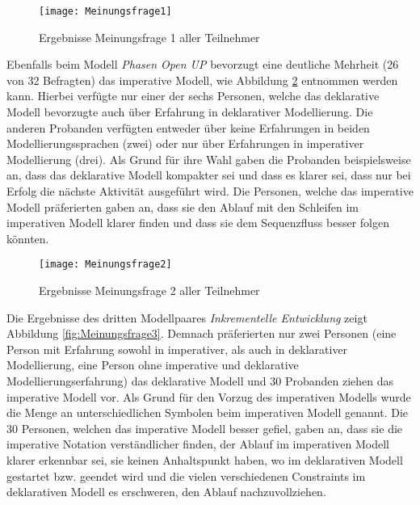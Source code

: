\begin{figure}[htp]
\begin{center}
  \texttt{[image: Meinungsfrage1]} %
  \caption{Ergebnisse Meinungsfrage 1 aller Teilnehmer}
  \label{fig:Meinungsfrage1}
\end{center}
\end{figure}

Ebenfalls beim Modell \textit{Phasen Open UP} bevorzugt eine deutliche Mehrheit (26 von 32 Befragten) das imperative Modell, wie Abbildung \ref{fig:Meinungsfrage2} entnommen werden kann. \newline
Hierbei verfügte nur einer der sechs Personen, welche das deklarative Modell bevorzugte auch über Erfahrung in deklarativer Modellierung. Die anderen Probanden verfügten entweder über keine Erfahrungen in beiden Modellierungssprachen (zwei) oder nur über Erfahrungen in imperativer Modellierung (drei). Als Grund für ihre Wahl gaben die Probanden beispielsweise an, dass das deklarative Modell kompakter sei und dass es klarer sei, dass nur bei Erfolg die nächste Aktivität ausgeführt wird.\newline
Die Personen, welche das imperative Modell präferierten gaben an, dass sie den Ablauf mit den Schleifen im imperativen Modell klarer finden und dass sie dem Sequenzfluss besser folgen könnten.\newline


\begin{figure}[htp]
\begin{center}
  \texttt{[image: Meinungsfrage2]} %
  \caption{Ergebnisse Meinungsfrage 2 aller Teilnehmer}
  \label{fig:Meinungsfrage2}
\end{center}
\end{figure}

Die Ergebnisse des dritten Modellpaares \textit{Inkrementelle Entwicklung} zeigt Abbildung \ref{fig:Meinungsfrage3}. Demnach präferierten nur zwei Personen (eine Person mit Erfahrung sowohl in imperativer, als auch in deklarativer Modellierung, eine Person ohne imperative und deklarative Modellierungserfahrung) das deklarative Modell und 30 Probanden ziehen das imperative Modell vor.\newline
Als Grund für den Vorzug des imperativen Modells wurde die Menge an unterschiedlichen Symbolen beim imperativen Modell genannt. \newline
Die 30 Personen, welchen das imperative Modell besser gefiel, gaben an, dass sie die imperative Notation verständlicher finden, der Ablauf im imperativen Modell klarer erkennbar sei, sie keinen Anhaltspunkt haben, wo im deklarativen Modell gestartet bzw. geendet wird und die vielen verschiedenen Constraints im deklarativen Modell es erschweren, den Ablauf nachzuvollziehen.\newline

